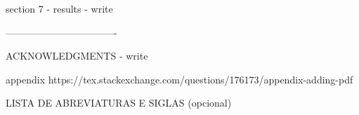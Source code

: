 section 7 - results
- write

----------------------------------

ACKNOWLEDGMENTS
- write

appendix
https://tex.stackexchange.com/questions/176173/appendix-adding-pdf


LISTA DE ABREVIATURAS E SIGLAS (opcional) 
